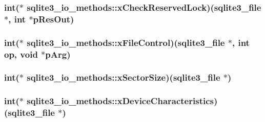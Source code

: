 \hypertarget{structsqlite3__io__methods_97f5eb0c2dc7e1cf2f8ecd6857e4c77c}{
\subsubsection[xCheckReservedLock]{\setlength{\rightskip}{0pt plus 5cm}int($\ast$ {\bf sqlite3\_\-io\_\-methods::xCheckReservedLock})({\bf sqlite3\_\-file} $\ast$, int $\ast$pResOut)}}
\label{structsqlite3__io__methods_97f5eb0c2dc7e1cf2f8ecd6857e4c77c}


\hypertarget{structsqlite3__io__methods_5d2a5ba7937b4a6c6c5ba62c4e2b9166}{
\subsubsection[xFileControl]{\setlength{\rightskip}{0pt plus 5cm}int($\ast$ {\bf sqlite3\_\-io\_\-methods::xFileControl})({\bf sqlite3\_\-file} $\ast$, int op, void $\ast$pArg)}}
\label{structsqlite3__io__methods_5d2a5ba7937b4a6c6c5ba62c4e2b9166}


\hypertarget{structsqlite3__io__methods_8436e6eeac404b35057be97f3c2b5c3d}{
\subsubsection[xSectorSize]{\setlength{\rightskip}{0pt plus 5cm}int($\ast$ {\bf sqlite3\_\-io\_\-methods::xSectorSize})({\bf sqlite3\_\-file} $\ast$)}}
\label{structsqlite3__io__methods_8436e6eeac404b35057be97f3c2b5c3d}


\hypertarget{structsqlite3__io__methods_ce5e9e9f267c6c57023109c0658f2683}{
\subsubsection[xDeviceCharacteristics]{\setlength{\rightskip}{0pt plus 5cm}int($\ast$ {\bf sqlite3\_\-io\_\-methods::xDeviceCharacteristics})({\bf sqlite3\_\-file} $\ast$)}}
\label{structsqlite3__io__methods_ce5e9e9f267c6c57023109c0658f2683}


